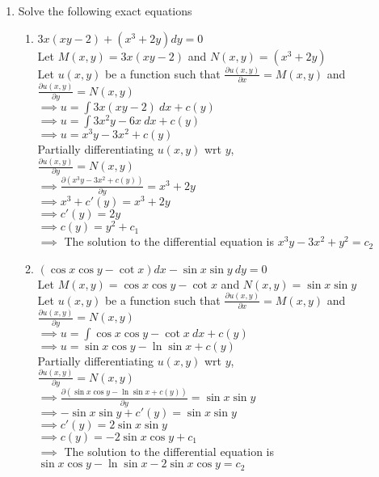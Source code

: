 \documentclass[a4paper]{article}
\begin{document}
\begin{enumerate}
\item{Solve the following exact equations
\begin{enumerate}
\item{$3x(xy-2)+(x^3+2y)dy=0$
\\Let $M(x,y)=3x(xy-2)$ and $N(x,y)=(x^3+2y)$
\\Let $u(x,y)$ be a function such that $\frac{\partial u(x,y)}{\partial x}=M(x,y)$ and $\frac{\partial u(x,y)}{\partial y}=N(x,y)$
\\$\implies u=\int 3x(xy-2) \ dx +c(y)$
\\$\implies u=\int 3x^2y - 6x \ dx +c(y)$
\\$\implies u=x^3y - 3x^2 +c(y)$
\\Partially differentiating $u(x,y)$ wrt $y$,
\\$\frac{\partial u(x,y)}{\partial y}=N(x,y)$
\\$\implies \frac{\partial (x^3y - 3x^2 +c(y))}{\partial y}=x^3+2y$
\\$\implies x^3+c'(y)=x^3+2y$
\\$\implies c'(y)=2y$
\\$\implies c(y)=y^2+c_1$
\\$\implies$ The solution to the differential equation is $x^3y - 3x^2 +y^2=c_2$
}

\item{$(\cos x \cos y - \cot x) dx - \sin x \sin y \ dy =0$
\\Let $M(x,y)=\cos x \cos y - \cot x$ and $N(x,y)=\sin x \sin y$
\\Let $u(x,y)$ be a function such that $\frac{\partial u(x,y)}{\partial x}=M(x,y)$ and $\frac{\partial u(x,y)}{\partial y}=N(x,y)$
\\$\implies u=\int \cos x \cos y - \cot x \ dx + c(y)$
\\$\implies u=\sin x \cos y - \ln\sin x + c(y)$
\\Partially differentiating $u(x,y)$ wrt $y$,
\\$\frac{\partial u(x,y)}{\partial y}=N(x,y)$
\\$\implies\frac{\partial (\sin x \cos y - \ln\sin x + c(y))}{\partial y}=\sin x \sin y$
\\$\implies -\sin x \sin y+c'(y)=\sin x \sin y$
\\$\implies c'(y)=2\sin x \sin y$
\\$\implies c(y)=-2\sin x \cos y+c_1$
\\$\implies$ The solution to the differential equation is $\sin x \cos y - \ln\sin x -2\sin x \cos y=c_2$
}


\end{enumerate}}
\end{enumerate}
\end{document}
